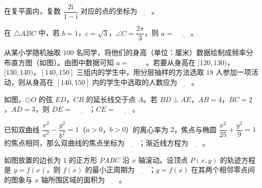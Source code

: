 \begin{question}
在复平面内，复数 $\dfrac{2\mathrm i}{1-\mathrm i}$ 对应的点的坐标为$\underline{\qquad}$。

\end{question}
\begin{question}
在 $\triangle ABC$ 中，若 $b=1$，$c=\sqrt3$，$\angle C=\dfrac{2\pi}3$，则 $a=$ $\underline{\qquad}$。

\Needspace{0.4\textheight}
\end{question}
\begingroup
\renewenvironment{question}{\Needspace{0.5\textheight}}{}
\begin{question}
从某小学随机抽取 $100$ 名同学，将他们的身高（单位：厘米）数据绘制成频率分布直方图（如图）。由图中数据可知 $a=$ $\underline{\qquad}$。若要从身高在 $[120,130)$，$[130,140)$，$[140,150]$ 三组内的学生中，用分层抽样的方法选取 $18$ 人参加一项活动，则从身高在 $[140,150]$ 内的学生中选取的人数应为$\underline{\qquad}$。
\nopagebreak[4]
\begin{center}\end{center}
\nopagebreak[4]
\Needspace{0.4\textheight}
\end{question}
\endgroup
\begingroup
\renewenvironment{question}{\Needspace{0.5\textheight}}{}
\begin{question}
如图，$\odot O$ 的弦 $ED$，$CB$ 的延长线交于点 $A$。若 $BD\perp AE$，$AB=4$，$BC=2$，$AD=3$，则 $DE=$ $\underline{\qquad}$；$CE=$ $\underline{\qquad}$。
\nopagebreak[4]
\begin{center}\end{center}
\nopagebreak[4]
\end{question}
\endgroup
\begin{question}
已知双曲线 $\dfrac{x^2}{a^2}-\dfrac{y^2}{b^2}=1$（$a>0$，$b>0$）的离心率为 $2$，焦点与椭圆 $\dfrac{x^2}{25}+\dfrac{y^2}9=1$ 的焦点相同，那么双曲线的焦点坐标为$\underline{\qquad}$；渐近线方程为$\underline{\qquad}$。

\Needspace{0.4\textheight}
\end{question}
\begingroup
\renewenvironment{question}{\Needspace{0.5\textheight}}{}
\begin{question}
如图放置的边长为 $1$ 的正方形 $PABC$ 沿 $x$ 轴滚动。设顶点 $P(x,y)$ 的轨迹方程是 $y=f(x)$，则 $f(x)$ 的最小正周期为$\underline{\qquad}$；$y=f(x)$ 在其两个相邻零点间的图象与 $x$ 轴所围区域的面积为$\underline{\qquad}$。
\nopagebreak[4]
\begin{center}\end{center}
\nopagebreak[4]
\end{question}
\endgroup
{}

